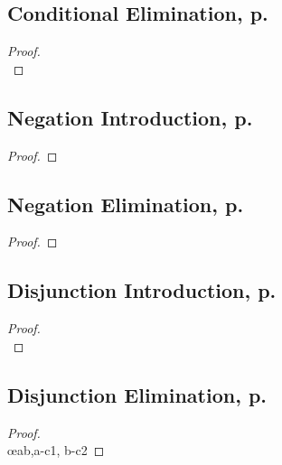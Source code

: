 \begin{multicols}{2}
\subsection{Conditional Elimination, p.\ \pageref{condelim}}
\begin{proof}
\\	
	 
\end{proof}



\subsection{Negation Introduction, p.\ \pageref{negint}}

\begin{proof}
\open
\close
{}
\end{proof}


\subsection{Negation Elimination, p.\ \pageref{negelim}}
\begin{proof}
\open
\close
{}
\end{proof}





\subsection{Disjunction Introduction, p.\ \pageref{disjint}}

\begin{proof}

\\	
\end{proof}

\subsection{Disjunction Elimination, p.\ \pageref{disjelim}}
\begin{proof}
\\	\open
	\close
	\open
	\close
	 \oe{ab,a-c1, b-c2}
\end{proof}




\end{multicols}
